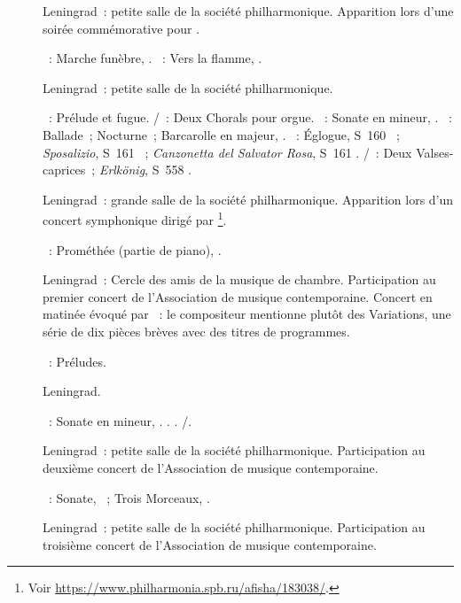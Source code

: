 \begin{description}
 \item[]
 Leningrad~: petite salle de la société philharmonique.
 Apparition lors d'une soirée commémorative pour \VKaratigine{}.

 \textsc{\Medtner{}}~: Marche funèbre,  .
 \textsc{\Scriabine{}}~: Vers la flamme, .
 \item[]
 Leningrad~: petite salle de la société philharmonique.

 \textsc{\JBach{}}~: Prélude et fugue.
 \textsc{\JBach{}/\Busoni{}}~: Deux Chorals pour orgue.
 \textsc{\Beethoven{}}~: Sonate en \kC mineur, .
 \textsc{\Chopin{}}~: Ballade~; Nocturne~; Barcarolle en \kF \Sharp majeur,
 .
 \textsc{\Liszt{}}~: Églogue, S~160 ~; \emph{Sposalizio}, S~161
 ~; \emph{Canzonetta del Salvator Rosa}, S~161 .
 \textsc{\Schubert{}/\Liszt{}}~: Deux Valses-caprices~; \emph{Erlkönig},
 S~558 .
 \item[]
 Leningrad~: grande salle de la société philharmonique.
 Apparition lors d'un concert symphonique dirigé par \NMalko{}%
 \footnote{Voir \href{https://www.philharmonia.spb.ru/afisha/183038/}%
 {https://www.philharmonia.spb.ru/afisha/183038/}.}.

 \textsc{\Scriabine{}}~: Prométhée (partie de piano), .
 \item[]
 Leningrad~: Cercle des amis de la musique de chambre.
 Participation au premier concert de l'\hbox{Association} de musique
 contemporaine.
 Concert en matinée évoqué par \citet{Bogdanov67a}~: le compositeur
 mentionne plutôt des Variations, une série de dix pièces brèves avec des
 titres de programmes.

 \textsc{\BogdanovBerezovsky{}}~: Préludes.
 \item[]
 Leningrad.

 \textsc{\Beethoven{}}~: Sonate en \kC mineur, .
 \textsc{\Chopin{}}.
 \textsc{\Liszt{}}.
 \textsc{\Schubert{}/\Liszt{}}.
 \item[]
 Leningrad~: petite salle de la société philharmonique.
 Participation au deuxième concert de l'\hbox{Association} de musique
 contemporaine.

 \textsc{\Scriabine{}}~: Sonate, ~; Trois Morceaux, .
 \item[]
 Leningrad~: petite salle de la société philharmonique.
 Participation au troisième concert de l'\hbox{Association} de musique
 contemporaine.


\end{description}
